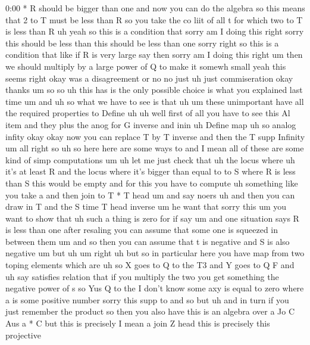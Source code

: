 \begin{unfinished}{0:00}
*  R  should  be  bigger  than  one  and  now
you  can  do  the  algebra  so  this  means
that  2  to  T  must  be  less  than  R  so  you
take  the  co  liit  of  all  t  for  which  two
to  T  is  less  than
R
uh  yeah  so  this  is  a  condition
that  sorry  am  I  doing  this  right
sorry  this  should  be  less  than  this
should  be  less  than  one
sorry  right  so  this  is  a  condition
that  like  if  R  is  very  large  say
then  sorry  am  I  doing  this
right  um  then  we  should  multiply  by  a
large  power  of  Q  to  make  it  somewh  small
yeah  this  seems  right
okay  was  a  disagreement  or  no  no  just  uh
just
commiseration  okay  thanks  um  so  so  uh
this  has  is  the  only  possible  choice  is
what  you  explained  last
time
um  and  uh  so  what  we  have  to  see  is  that
uh  um  these  unimportant  have  all  the
required  properties  to  Define
uh
uh  well  first  of  all  you  have  to  see
this  Al
item
and
they  plus  the  anog  for  G
inverse  and
inin  uh  Define
map  uh
so  analog  infity
okay
okay  now  you  can  replace  T  by  T  inverse
and  then  the  T  supp  Infinity
um  all  right  so
uh  so  here  here  are  some  ways
to  and  I  mean  all  of  these  are  some  kind
of  simp  computations  um  uh  let  me  just
check  that
uh  the  locus
where  uh  it's  at  least  R  and  the  locus
where  it's  bigger  than  equal  to  to  S
where  R  is  less  than  S  this  would  be
empty  and  for  this  you  have  to  compute
uh  something  like  you  take  a  and  then
join  to  T  *  T
head
um  and  say
noers
uh  and  then  you  can  draw
in  T
and  the  S  time  T  head  inverse  um  he  want
that  sorry
this  um  you  want  to  show  that  uh  such  a
thing  is  zero  for
if
say
um  and  one  situation  says  R  is  less  than
one  after  resaling  you  can  assume  that
some  one  is  squeezed  in  between  them
um  and  so  then  you  can  assume  that  t  is
negative  and  S  is  also
negative
um
but
uh
um  right  uh
but
so  in  particular  here  you  have  map
from  two  toping  elements  which  are  uh  so
X  goes  to  Q  to  the  T3  and  Y  goes  to  Q
F  and  uh  say  satisfies  relation  that  if
you  multiply  the  two  you  get  something
the  negative  power  of  s  so  Yus  Q  to  the
I  don't  know
some
axy  is  equal  to  zero  where  a  is  some
positive
number  sorry  this  supp
to  and  so  but  uh  and  in  turn  if  you  just
remember  the  product  so  then  you  also
have
this  is  an  algebra  over  a  Jo  C  Aus  a  *
C  but  this  is  precisely  I  mean  a  join  Z
head  this  is  precisely  this  projective

\end{unfinished}
